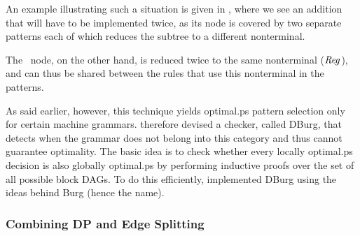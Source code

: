 An example illustrating such a situation is given in ,
where we see an addition that will have to be implemented twice, as its
\gls{node} is covered by two separate \glspl{pattern} each of which reduces the
\gls{subtree} to a different \gls{nonterminal}.
%
\begin{figure}
  \mbox{}%
  \hfill%
  \hfill%
\end{figure}
%
The ~\gls{node}, on the other hand, is reduced twice to the same
\gls{nonterminal} ($\mNT{Reg}$), and can thus be shared between the \glspl{rule}
that use this \gls{nonterminal} in the \glspl{pattern}.

As said earlier, however, this technique yields \gls{optimal.ps} \gls{pattern
  selection} only for certain \glspl{machine grammar}.
%
\citeauthor{Ertl:1999} therefore devised a checker, called \gls{DBurg}, that
detects when the \gls{grammar} does not belong into this category and thus
cannot guarantee optimality.
%
The basic idea is to check whether every locally \gls{optimal.ps} decision is
also globally \gls{optimal.ps} by performing inductive proofs over the set of
all possible \glspl{block DAG}.
%
To do this efficiently, \citeauthor{Ertl:1999} implemented \gls{DBurg} using the
ideas behind \gls{Burg} (hence the name).


\subsubsection{Combining DP and Edge Splitting}

\def\overlapCost{overlap-cost\xspace}
\def\cseCost{cse-cost\xspace}


